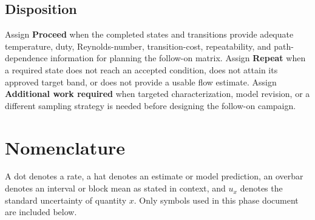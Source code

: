 \documentclass[11pt]{article}
\begin{document}
\subsection{Disposition}

Assign \textbf{Proceed} when the completed states and transitions provide adequate temperature, duty, Reynolds-number, transition-cost, repeatability, and path-dependence information for planning the follow-on matrix. Assign \textbf{Repeat} when a required state does not reach an accepted condition, does not attain its approved target band, or does not provide a usable flow estimate. Assign \textbf{Additional work required} when targeted characterization, model revision, or a different sampling strategy is needed before designing the follow-on campaign.

\clearpage
\appendix
\section{Nomenclature}
\label{sec:nomenclature}
A dot denotes a rate, a hat denotes an estimate or model prediction, an overbar denotes an interval or block mean as stated in context, and $u_x$ denotes the standard uncertainty of quantity $x$. Only symbols used in this phase document are included below.
\end{document}
